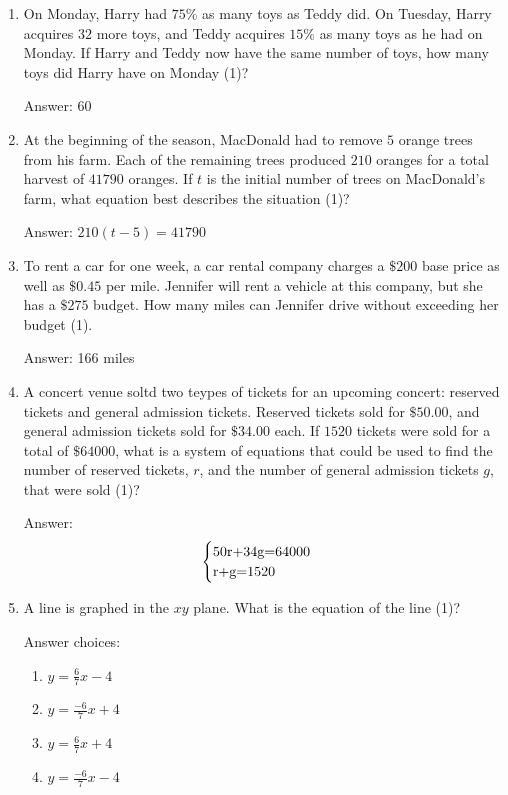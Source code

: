 \documentclass{article}
\begin{document}
\begin{enumerate}
{	      Answer: Each additional hour of painting the exterior costs $\$155$}

	\item {
	      On Monday, Harry had $75\%$ as many toys as Teddy did. On Tuesday, Harry acquires $32$ more toys, and Teddy acquires $15\%$ as many toys as he had on Monday. If Harry and Teddy now have the same number of toys, how many toys did Harry have on Monday (1)?

	      Answer: 60
	      }


	\item {
	      At the beginning of the season, MacDonald had to remove $5$ orange trees from his farm. Each of the remaining trees produced $210$ oranges for a total harvest of $41790$ oranges. If $t$ is the initial number of trees on MacDonald's farm, what equation best describes the situation (1)?

	      Answer: $210(t-5)=41790$
	      }

	\item {
	      To rent a car for one week, a car rental company charges a $\$200$ base price as well as $\$0.45$ per mile. Jennifer will rent a vehicle at this company, but she has a $\$275$ budget. How many miles can Jennifer drive without exceeding her budget (1).

	      Answer: 166 miles
	      }

	\item {
	      A concert venue soltd two teypes of tickets for an upcoming concert: reserved tickets and general admission tickets. Reserved tickets sold for $\$50.00$, and general admission tickets sold for $\$34.00$ each. If $1520$ tickets were sold for a total of $\$64000$, what is a system of equations that could be used to find the number of reserved tickets, $r$, and the number of general admission tickets $g$, that were sold (1)?

	      Answer:
	      \[
		      \begin{array}{l}
			      \begin{cases}
				      $50r+34g=64000$ & \\
				      $r+g=1520$
			      \end{cases}
		      \end{array}\]
	      }
	\item {A line is graphed in the $xy$ plane. What is the equation of the line (1)?

	      Answer choices:
	      \begin{enumerate}
		      \item{\(y=\frac{6}{7}x-4\)}
		      \item{\(y=\frac{-6}{7}x+4\)}
		      \item{\(y=\frac{6}{7}x+4\)}
		      \item{\(y=\frac{-6}{7}x-4\)}
	      \end{enumerate}

}
\end{enumerate}
\end{document}
